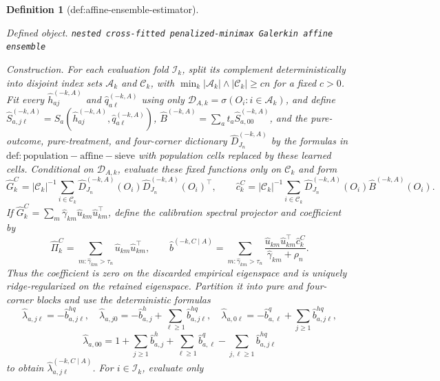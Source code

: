 \documentclass{article}
\newtheorem{definition}{Definition}
\begin{document}
\begin{definition}[def:affine-ensemble-estimator]\label{def:affine-ensemble-estimator}
\par\smallskip\noindent\emph{Defined object.} \texttt{nested cross-\allowbreak{}fitted penalized-\allowbreak{}minimax Galerkin affine ensemble}
\par\smallskip\noindent\emph{Construction.} For each evaluation fold \(\mathcal I_k\), split its complement deterministically into disjoint index sets \(\mathcal A_k\) and \(\mathcal C_k\), with \(\min_k|\mathcal A_k|\wedge|\mathcal C_k|\ge c n\) for a fixed \(c>0\).  Fit every \(\widehat h_{aj}^{(-k,A)}\) and \(\widehat q_{a\ell}^{(-k,A)}\) using only \(\mathcal D_{A,k}=\sigma(O_i:i\in\mathcal A_k)\), and define \(\widehat S_{a,j\ell}^{(-k,A)}=S_a(\widehat h_{aj}^{(-k,A)},\widehat q_{a\ell}^{(-k,A)})\), \(\widehat B^{(-k,A)}=\sum_at_a\widehat S_{a,00}^{(-k,A)}\), and the pure-outcome, pure-treatment, and four-corner dictionary \(\widehat D_{J_n}^{(-k,A)}\) by the formulas in \(\mathrm{def:population-affine-sieve}\) with population cells replaced by these learned cells.  Conditional on \(\mathcal D_{A,k}\), evaluate these fixed functions only on \(\mathcal C_k\) and form
\[
 \widehat G_k^C=|\mathcal C_k|^{-1}\sum_{i\in\mathcal C_k}
 \widehat D_{J_n}^{(-k,A)}(O_i)\widehat D_{J_n}^{(-k,A)}(O_i)^\top,
 \qquad
 \widehat c_k^C=|\mathcal C_k|^{-1}\sum_{i\in\mathcal C_k}
 \widehat D_{J_n}^{(-k,A)}(O_i)\widehat B^{(-k,A)}(O_i).
\]
If \(\widehat G_k^C=\sum_m\widehat\gamma_{km}\widehat u_{km}\widehat u_{km}^\top\), define the calibration spectral projector and coefficient by
\[
 \widehat\Pi_k^C=\sum_{m:\widehat\gamma_{km}>\tau_n}\widehat u_{km}\widehat u_{km}^\top,
 \qquad
 \widehat b^{(-k,C\mid A)}=
 \sum_{m:\widehat\gamma_{km}>\tau_n}
 \frac{\widehat u_{km}\widehat u_{km}^\top\widehat c_k^C}
      {\widehat\gamma_{km}+\rho_n}.
\]
Thus the coefficient is zero on the discarded empirical eigenspace and is uniquely ridge-regularized on the retained eigenspace.  Partition it into pure and four-corner blocks and use the deterministic formulas
\[
 \widehat\lambda_{a,j\ell}=-\widehat b^{hq}_{a,j\ell},\quad
 \widehat\lambda_{a,j0}=-\widehat b^h_{a,j}+\sum_{\ell\ge1}\widehat b^{hq}_{a,j\ell},\quad
 \widehat\lambda_{a,0\ell}=-\widehat b^q_{a,\ell}+\sum_{j\ge1}\widehat b^{hq}_{a,j\ell},
\]
\[
 \widehat\lambda_{a,00}=1+\sum_{j\ge1}\widehat b^h_{a,j}
 +\sum_{\ell\ge1}\widehat b^q_{a,\ell}
 -\sum_{j,\ell\ge1}\widehat b^{hq}_{a,j\ell}
\]
to obtain \(\widehat\lambda_{a,j\ell}^{(-k,C\mid A)}\).  For \(i\in\mathcal I_k\), evaluate only

\end{definition}
\end{document}
